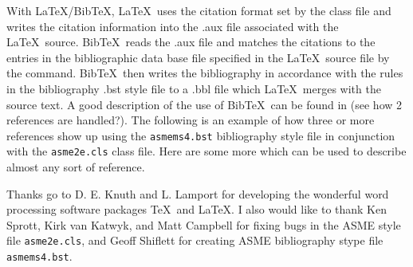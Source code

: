 \documentclass[twocolumn,10pt]{asme2e}
\begin{document}
{With \LaTeX/{\sc Bib}\TeX, \LaTeX\ uses the citation format set by the class file and writes the citation information into the .aux file associated with the \LaTeX\ source. {\sc Bib}\TeX\ reads the .aux file and matches the citations to the entries in the bibliographic data base file specified in the \LaTeX\ source file by the \verb++ command. {\sc Bib}\TeX\ then writes the bibliography in accordance with the rules in the bibliography .bst style file to a .bbl file which \LaTeX\ merges with the source text.  A good description of the use of {\sc Bib}\TeX\ can be found in \cite{latex, goosens} (see how 2 references are handled?).  The following is an example of how three or more references \cite{latex, asmemanual,  goosens} show up using the \verb+asmems4.bst+ bibliography style file in conjunction with the \verb+asme2e.cls+ class file. Here are some more \cite{art, blt, ibk, icn, ips, mts, mis, pro, pts, trt, upd} which can be used to describe almost any sort of reference.




\begin{acknowledgment}
Thanks go to D. E. Knuth and L. Lamport for developing the wonderful word processing software packages \TeX\ and \LaTeX. I also would like to thank Ken Sprott, Kirk van Katwyk, and Matt Campbell for fixing bugs in the ASME style file \verb+asme2e.cls+, and Geoff Shiflett for creating 
ASME bibliography stype file \verb+asmems4.bst+.
\end{acknowledgment}

%



}
\end{document}
